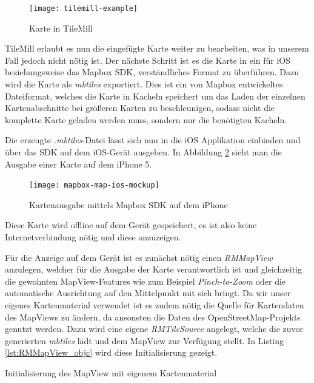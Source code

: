 \begin{figure}[htb!]
	\centering
	\texttt{[image: tilemill-example]}
	\caption{Karte in TileMill}
	\label{tilemill-example}
\end{figure}

TileMill erlaubt es nun die eingefügte Karte weiter zu bearbeiten, was in unserem Fall jedoch nicht nötig ist.
Der nächste Schritt ist es die Karte in ein für iOS beziehungsweise das Mapbox SDK, verständliches Format zu überführen.
Dazu wird die Karte als \emph{mbtiles} exportiert. Dies ist ein von Mapbox entwickeltes Dateiformat, welches die Karte in Kacheln speichert um das Laden der einzelnen Kartenabschnitte bei größeren Karten zu beschleunigen, sodass nicht die komplette Karte geladen werden muss, sondern nur die benötigten Kacheln.

Die erzeugte \emph{.mbtiles}-Datei lässt sich nun in die iOS Applikation einbinden und über das SDK auf dem iOS-Gerät ausgeben. In Abbildung \ref{mapbox-map-ios} sieht man die Ausgabe einer Karte auf dem iPhone 5.

\begin{figure}[htb!]
		\centering
	\texttt{[image: mapbox-map-ios-mockup]}
	\caption{Kartenausgabe mittels Mapbox SDK auf dem iPhone}
	\label{mapbox-map-ios}
\end{figure}

Diese Karte wird offline auf dem Gerät gespeichert, es ist also keine Internetverbindung nötig und diese anzuzeigen.

Für die Anzeige auf dem Gerät ist es zunächst nötig einen \emph{RMMapView} anzulegen, welcher für die Ausgabe der Karte verantwortlich ist und gleichzeitig die gewohnten MapView-Features wie zum Beispiel \emph{Pinch-to-Zoom} oder die automatische Ausrichtung auf den Mittelpunkt mit sich bringt.
Da wir unser eigenes Kartenmaterial verwendet ist es zudem nötig die Quelle für Kartendaten des MapViews zu ändern, da ansonsten die Daten des OpenStreetMap-Projekts genutzt werden. Dazu wird eine eigene \emph{RMTileSource} angelegt, welche die zuvor generierten \emph{mbtiles} lädt und dem MapView zur Verfügung stellt. 
In Listing \ref{lst:RMMapView_objc} wird diese Initialisierung gezeigt.
\begin{listing}[htb!]
    \caption{Initialisierung des MapView mit eigenem Kartenmaterial}
	\label{lst:RMMapView_objc}
\end{listing}

